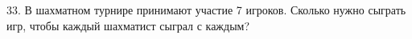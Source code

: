 33. В шахматном турнире принимают участие 7 игроков. Сколько нужно сыграть игр, чтобы каждый шахматист сыграл с каждым?\\
